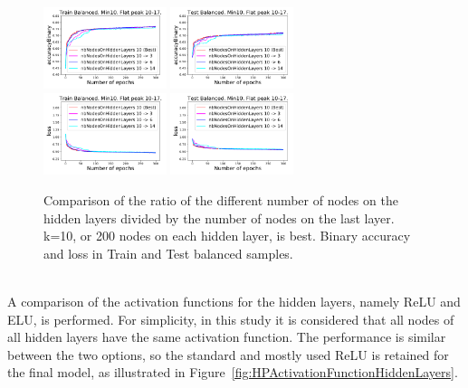 \begin{figure}[!htb]
\centering
\includegraphics[width=0.32\textwidth]{plots/plot_01_1_overlay_graph_accuracyBinary_Train_NbNodesOnHiddenLayers.pdf}
\includegraphics[width=0.32\textwidth]{plots/plot_01_1_overlay_graph_accuracyBinary_Test_NbNodesOnHiddenLayers.pdf}\\
\includegraphics[width=0.32\textwidth]{plots/plot_01_1_overlay_graph_loss_Train_NbNodesOnHiddenLayers.pdf}
\includegraphics[width=0.32\textwidth]{plots/plot_01_1_overlay_graph_loss_Test_NbNodesOnHiddenLayers.pdf}\\
\caption{Comparison of the ratio of the different number of nodes on the hidden layers divided by the number of nodes on the last layer. k=10, or 200 nodes on each hidden layer, is best. Binary accuracy and loss in Train and Test balanced samples.}
\label{fig:HPNbNodesOnHiddenLayers}
\end{figure}

\ \\A comparison of the activation functions for the hidden layers, namely ReLU and ELU, is performed. For simplicity, in this study it is considered that all nodes of all hidden layers have the same activation function. The performance is similar between the two options, so the standard and mostly used ReLU is retained for the final model, as illustrated in Figure~\ref{fig:HPActivationFunctionHiddenLayers}.

